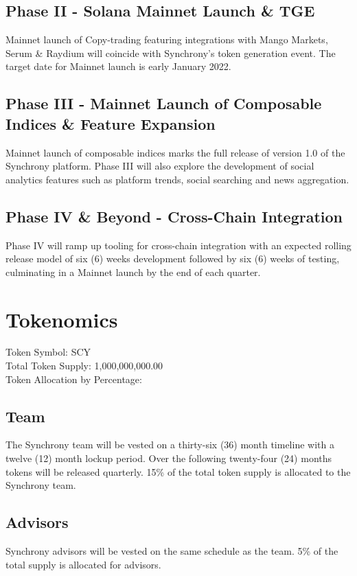 \documentclass[10pt]{article}
\begin{document}
					\subsection{Phase II - Solana Mainnet Launch \& TGE}
					Mainnet launch of Copy-trading featuring integrations with Mango Markets, Serum
					\& Raydium will coincide with Synchrony's token generation event. The target
					date for Mainnet launch is early January 2022.

					\subsection{Phase III - Mainnet Launch of Composable Indices \& Feature Expansion}
					Mainnet launch of composable indices marks the full release of version 1.0 of
					the Synchrony platform. Phase III will also explore the development of social
					analytics features such as platform trends, social searching and news
					aggregation.

					\subsection{Phase IV \& Beyond - Cross-Chain Integration}
					Phase IV will ramp up tooling for cross-chain integration with an expected
					rolling release model of six (6) weeks development followed by six (6) weeks of
					testing, culminating in a Mainnet launch by the end of each quarter.

					\section{Tokenomics}
					Token Symbol: SCY\\
					Total Token Supply: 1,000,000,000.00\\
					Token Allocation by Percentage:

					\subsection{Team}
					The Synchrony team will be vested on a thirty-six (36) month timeline with
					a twelve (12) month lockup period. Over the following twenty-four (24) months
					tokens will be released quarterly. 15\% of the total token supply is allocated
					to the Synchrony team.

					\subsection{Advisors}
					Synchrony advisors will be vested on the same schedule as the team. 5\% of the
					total supply is allocated for advisors.
\end{document}
